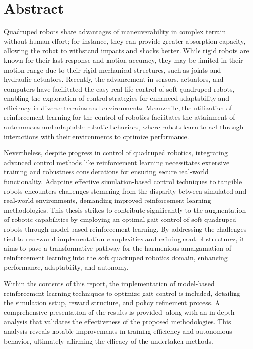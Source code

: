 \chapter*{Abstract}

Quadruped robots share advantages of maneuverability in complex terrain without human effort; for instance, they can provide greater absorption capacity, allowing the robot to withstand impacts and shocks better. While rigid robots are known for their fast response and motion accuracy, they may be limited in their motion range due to their rigid mechanical structures, such as joints and hydraulic actuators. Recently, the advancement in sensors, actuators, and computers have facilitated the easy real-life control of soft quadruped robots, enabling the exploration of control strategies for enhanced adaptability and efficiency in diverse terrains and environments. Meanwhile, the utilization of reinforcement learning for the control of robotics facilitates the attainment of autonomous and adaptable robotic behaviors, where robots learn to act through interactions with their environments to optimize performance. 

Nevertheless, despite progress in control of quadruped robotics, integrating advanced control methods like reinforcement learning necessitates extensive training and robustness considerations for ensuring secure real-world functionality. Adapting effective simulation-based control techniques to tangible robots encounters challenges stemming from the disparity between simulated and real-world environments, demanding improved reinforcement learning methodologies. This thesis strikes to contribute significantly to the augmentation of robotic capabilities by employing an optimal gait control of soft quadruped robots through model-based reinforcement learning. By addressing the challenges tied to real-world implementation complexities and refining control structures, it aims to pave a transformative pathway for the harmonious amalgamation of reinforcement learning into the soft quadruped robotics domain, enhancing performance, adaptability, and autonomy.

Within the contents of this report, the implementation of model-based reinforcement learning techniques to optimize gait control is included, detailing the simulation setup, reward structure, and policy refinement process. A comprehensive presentation of the results is provided, along with an in-depth analysis that validates the effectiveness of the proposed methodologies. This analysis reveals notable improvements in training efficiency and autonomous behavior, ultimately affirming the efficacy of the undertaken methods.

